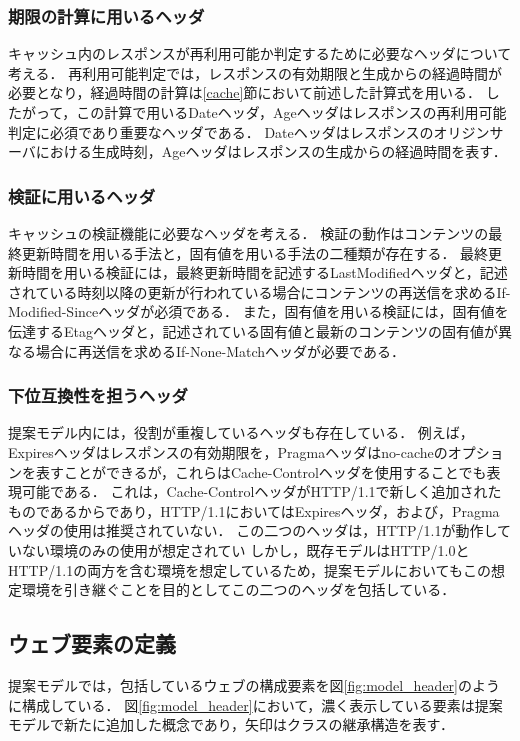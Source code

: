 \documentclass{css}
\begin{document}
\subsubsection{期限の計算に用いるヘッダ}
キャッシュ内のレスポンスが再利用可能か判定するために必要なヘッダについて考える．
再利用可能判定では，レスポンスの有効期限と生成からの経過時間が必要となり，経過時間の計算は\ref{cache}節において前述した計算式を用いる．
したがって，この計算で用いるDateヘッダ，Ageヘッダはレスポンスの再利用可能判定に必須であり重要なヘッダである．
Dateヘッダはレスポンスのオリジンサーバにおける生成時刻，Ageヘッダはレスポンスの生成からの経過時間を表す．

\subsubsection{検証に用いるヘッダ}
キャッシュの検証機能に必要なヘッダを考える．
検証の動作はコンテンツの最終更新時間を用いる手法と，固有値を用いる手法の二種類が存在する．
最終更新時間を用いる検証には，最終更新時間を記述するLastModifiedヘッダと，記述されている時刻以降の更新が行われている場合にコンテンツの再送信を求めるIf-Modified-Sinceヘッダが必須である．
また，固有値を用いる検証には，固有値を伝達するEtagヘッダと，記述されている固有値と最新のコンテンツの固有値が異なる場合に再送信を求めるIf-None-Matchヘッダが必要である．

\subsubsection{下位互換性を担うヘッダ}
提案モデル内には，役割が重複しているヘッダも存在している．
例えば，Expiresヘッダはレスポンスの有効期限を，Pragmaヘッダはno-cacheのオプションを表すことができるが，これらはCache-Controlヘッダを使用することでも表現可能である．
これは，Cache-ControlヘッダがHTTP/1.1で新しく追加されたものであるからであり，HTTP/1.1においてはExpiresヘッダ，および，Pragmaヘッダの使用は推奨されていない．
この二つのヘッダは，HTTP/1.1が動作していない環境のみの使用が想定されてい
しかし，既存モデルはHTTP/1.0とHTTP/1.1の両方を含む環境を想定しているため，提案モデルにおいてもこの想定環境を引き継ぐことを目的としてこの二つのヘッダを包括している．

\subsection{ウェブ要素の定義}
提案モデルでは，包括しているウェブの構成要素を図\ref{fig:model_header}のように構成している．
図\ref{fig:model_header}において，濃く表示している要素は提案モデルで新たに追加した概念であり，矢印はクラスの継承構造を表す．
\end{document}
